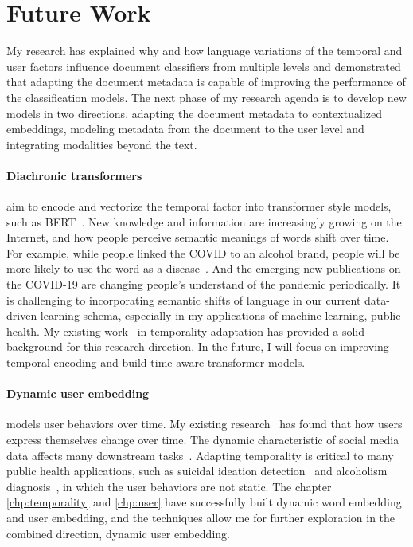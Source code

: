 \section{Future Work}

My research has explained why and how language variations of the temporal and user factors influence document classifiers from multiple levels and demonstrated that adapting the document metadata is capable of improving the performance of the classification models.
The next phase of my research agenda is to develop new models in two directions, adapting the document metadata to contextualized embeddings, modeling metadata from the document to the user level and integrating modalities beyond the text.

\paragraph{Diachronic transformers}
aim to encode and vectorize the temporal factor into transformer style models, such as BERT~\cite{devlin2019bert}.
New knowledge and information are increasingly growing on the Internet, and how people perceive semantic meanings of words shift over time. 
For example, while people linked the COVID to an alcohol brand, people will be more likely to use the word as a disease~\cite{broniatowski2020covid}. 
And the emerging new publications on the COVID-19 are changing people's understand of the pandemic periodically.
It is challenging to incorporating semantic shifts of language in our current data-driven learning schema, especially in my applications of machine learning, public health. 
My existing work~\cite{huang2018examining, huang2018modeling, huang2019neural} in temporality adaptation has provided a solid background for this research direction.
In the future, I will focus on improving temporal encoding and build time-aware transformer models.


\paragraph{Dynamic user embedding}
models user behaviors over time. 
My existing research~\cite{huang2019neural} has found that how users express themselves change over time.
The dynamic characteristic of social media data affects many downstream tasks~\cite{pan2019social}. 
Adapting temporality is critical to many public health applications, such as suicidal ideation detection~\cite{huang2015topic, huang2017exploring} and alcoholism diagnosis~\cite{huang2018modeling}, in which the user behaviors are not static.
The chapter \ref{chp:temporality} and \ref{chp:user} have successfully built dynamic word embedding and user embedding, and the techniques allow me for further exploration in the combined direction, dynamic user embedding.


